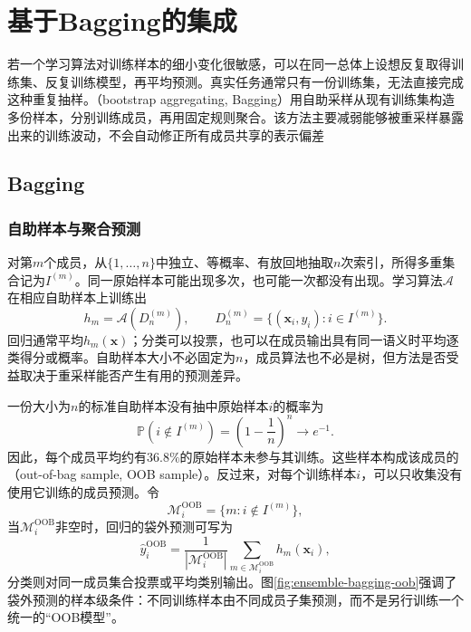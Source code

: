 \section{基于Bagging的集成}
\label{sec:ensemble-bagging}

若一个学习算法对训练样本的细小变化很敏感，可以在同一总体上设想反复取得训练集、反复训练模型，再平均预测。真实任务通常只有一份训练集，无法直接完成这种重复抽样。（bootstrap aggregating, Bagging）用自助采样从现有训练集构造多份样本，分别训练成员，再用固定规则聚合。该方法主要减弱能够被重采样暴露出来的训练波动，不会自动修正所有成员共享的表示偏差

\subsection{Bagging}
\label{sec:ensemble-bagging-bootstrap}

\subsubsection{自助样本与聚合预测}

对第$m$个成员，从$\{1,\ldots,n\}$中独立、等概率、有放回地抽取$n$次索引，所得多重集合记为$I^{(m)}$。同一原始样本可能出现多次，也可能一次都没有出现。学习算法$\mathcal{A}$在相应自助样本上训练出
\[
  h_m=\mathcal{A}\!\left(D_n^{(m)}\right),
  \qquad
  D_n^{(m)}=\{(\bm{x}_i,y_i):i\in I^{(m)}\}.
\]
回归通常平均$h_m(\bm{x})$；分类可以投票，也可以在成员输出具有同一语义时平均逐类得分或概率。自助样本大小不必固定为$n$，成员算法也不必是树，但方法是否受益取决于重采样能否产生有用的预测差异。

一份大小为$n$的标准自助样本没有抽中原始样本$i$的概率为
\begin{equation}
  \mathbb{P}\!\left(i\notin I^{(m)}\right)
  =
  \left(1-\frac{1}{n}\right)^n
  \longrightarrow e^{-1}.
  \label{eq:ensemble-oob-probability}
\end{equation}
因此，每个成员平均约有$36.8\%$的原始样本未参与其训练。这些样本构成该成员的（out-of-bag sample, OOB sample）。反过来，对每个训练样本$i$，可以只收集没有使用它训练的成员预测。令
\[
  \mathcal{M}_{i}^{\mathrm{OOB}}
  =\{m:i\notin I^{(m)}\},
\]
当$\mathcal{M}_{i}^{\mathrm{OOB}}$非空时，回归的袋外预测可写为
\begin{equation}
  \widehat{y}_{i}^{\mathrm{OOB}}
  =
  \frac{1}{|\mathcal{M}_{i}^{\mathrm{OOB}}|}
  \sum_{m\in\mathcal{M}_{i}^{\mathrm{OOB}}}h_m(\bm{x}_i),
  \label{eq:ensemble-oob-prediction}
\end{equation}
分类则对同一成员集合投票或平均类别输出。图\ref{fig:ensemble-bagging-oob}强调了袋外预测的样本级条件：不同训练样本由不同成员子集预测，而不是另行训练一个统一的“OOB模型”。

